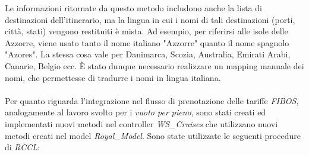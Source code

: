Le informazioni ritornate da questo metodo includono anche la lista di destinazioni dell'itinerario, ma la lingua in cui i nomi di tali destinazioni (porti, città, stati) vengono restituiti è mista. Ad esempio, per riferirsi alle isole delle Azzorre, viene usato tanto il nome italiano "Azzorre" quanto il nome spagnolo "Azores". La stessa cosa vale per Danimarca, Scozia, Australia, Emirati Arabi, Canarie, Belgio ecc. È stato dunque necessario realizzare un mapping manuale dei nomi, che permettesse di tradurre i nomi in lingua italiana.\\ \\
Per quanto riguarda l'integrazione nel flusso di prenotazione delle tariffe \textit{FIBOS}, analogamente al lavoro svolto per i \textit{vuoto per pieno}, sono stati creati ed implementati nuovi metodi nel controller \textit{WS\_Cruises} che utilizzano nuovi metodi creati nel model \textit{Royal\_Model}. Sono state utilizzate le seguenti procedure di \textit{RCCL}:

